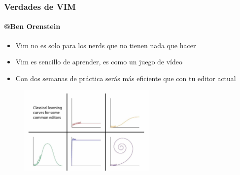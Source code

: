 \documentclass{beamer}
\begin{document}
  \begin{frame}[t]
    \frametitle{Verdades de VIM}
    \framesubtitle{@Ben Orenstein}
    \begin{itemize}
      \item Vim no es solo para los nerds que no tienen nada que hacer
      \item Vim es sencillo de aprender, es como un juego de vídeo
      \item Con dos semanas de práctica serás más eficiente que con tu editor actual
    \end{itemize}
    \begin{figure}[h]
      \centering
      \includegraphics[width=0.6\textwidth]{./resources/8.png}
      \label{fig:7}
    \end{figure}
  \end{frame}
\end{document}
